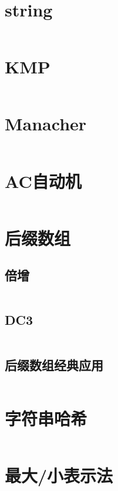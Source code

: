 \documentclass[a4paper,11pt]{article}
\begin{document}
\small

\newpage
\section*{string}
\inputminted[]{c++}{Template/String/STL.cpp}
\section*{KMP}
\inputminted[]{c++}{Template/String/KMP.cpp}
\section*{Manacher}
\inputminted[]{c++}{Template/String/Manacher.cpp}
\section*{AC自动机}
\inputminted[]{c++}{Template/String/TrieAC.cpp}
\section*{后缀数组}
\subsection*{倍增}
\inputminted[]{c++}{Template/String/Suffix-Array.cpp}
\subsection*{DC3}
\inputminted[]{c++}{Template/String/Suffix-Array-DC3.cpp}
\subsection*{后缀数组经典应用}
\inputminted[]{c++}{Template/String/SA-usage.cpp}
\section*{字符串哈希}
\inputminted[]{c++}{Template/String/Hash.cpp}
\section*{最大/小表示法}
\inputminted[]{c++}{Template/String/Express.cpp}
\end{document}
